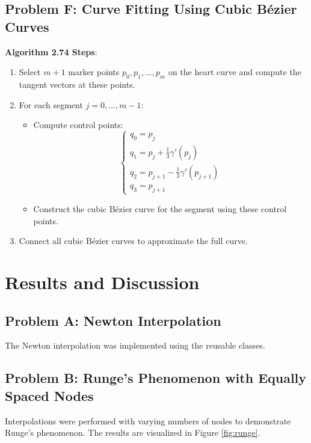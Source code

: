\documentclass{article}
\begin{document}
\subsection{Problem F: Curve Fitting Using Cubic Bézier Curves}

\textbf{Algorithm 2.74 Steps}:

\begin{enumerate}
    \item Select \( m+1 \) marker points \( p_0, p_1, \dots, p_m \) on the heart curve and compute the tangent vectors at these points.
    \item For each segment \( j = 0, \dots, m-1 \):
        \begin{itemize}
            \item Compute control points:
                \[
                \begin{cases}
                q_0 = p_j \\
                q_1 = p_j + \frac{1}{3}\gamma'(p_j) \\
                q_2 = p_{j+1} - \frac{1}{3}\gamma'(p_{j+1}) \\
                q_3 = p_{j+1}
                \end{cases}
                \]
            \item Construct the cubic Bézier curve for the segment using these control points.
        \end{itemize}
    \item Connect all cubic Bézier curves to approximate the full curve.
\end{enumerate}

\section{Results and Discussion}

\subsection{Problem A: Newton Interpolation}

The Newton interpolation was implemented using the reusable classes.

\subsection{Problem B: Runge's Phenomenon with Equally Spaced Nodes}

Interpolations were performed with varying numbers of nodes to demonstrate Runge's phenomenon. The results are visualized in Figure \ref{fig:runge}.
\end{document}

